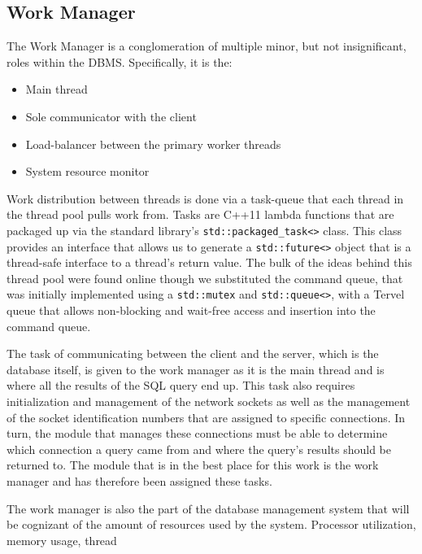 \documentclass[letterpaper, 12pt]{article}
\begin{document}
\newpage

\subsection{Work Manager}
The Work Manager is a conglomeration of multiple minor, but not insignificant, roles
within the DBMS. Specifically, it is the:
\begin{itemize}
  \item Main thread
  \item Sole communicator with the client
  \item Load-balancer between the primary worker threads
  \item System resource monitor
\end{itemize}

Work distribution between threads is done via a task-queue that each thread in the
thread pool pulls work from. Tasks are C++11 lambda functions that are packaged up 
via the standard library's \lstinline[basicstyle=\ttfamily]|std::packaged_task<>|
 class. 
This class provides an interface that allows us to generate a \lstinline[basicstyle=\ttfamily]|std::future<>| 
object that is a thread-safe interface to a thread's return value. The bulk of the 
ideas behind this thread pool were found online \cite{stackoverflow1} though we substituted
the command queue, that was initially implemented using a \lstinline[basicstyle=\ttfamily]|std::mutex|
and \lstinline[basicstyle=\ttfamily]|std::queue<>|, with a Tervel queue that allows
non-blocking and wait-free access and insertion into the command queue.
\par\vspace{\baselineskip}
The task of communicating between the client and the server, which is the database itself,
is given to the work manager as it is the main thread and is where all the results of
the SQL query end up. This task also requires initialization and management of the network
sockets as well as the management of the socket identification numbers that are assigned
to specific connections. In turn, the module that manages these connections must be able to
determine which connection a query came from and where the query's results should be
returned to. The module that is in the best place for this work is the work manager
and has therefore been assigned these tasks.
\par\vspace{\baselineskip}
The work manager is also the part of the database management system that will be cognizant
of the amount of resources used by the system. Processor utilization, memory usage, thread
\end{document}
